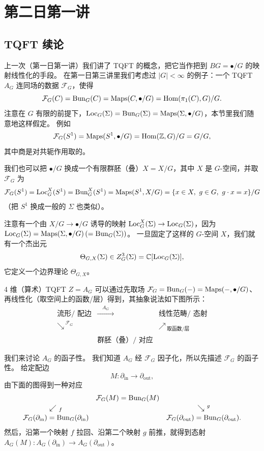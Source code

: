 \section{第二日第一讲}

\subsection{TQFT 续论}
上一次（第一日第一讲）我们讲了 TQFT 的概念，把它当作把到 $BG=\bullet/G$ 的映射线性化的手段。
在第一日第三讲里我们考虑过 $|G|<\infty$ 的例子：一个 TQFT $A_G$ 连同场的数据 $\mathcal F_G$，使得
\[
  \mathcal F_G(C)=\operatorname{Bun}_G(C)=\operatorname{Maps}(C,\bullet/G)=\operatorname{Hom}(\pi_1(C),G)/G.
\]
注意在 $G$ 有限的前提下，$\operatorname{Loc}_G(\Sigma)=\operatorname{Bun}_G(\Sigma)=\operatorname{Maps}(\Sigma,\bullet/G)$，本节里我们随意地这样假定。
例如
\[
  \mathcal F_G(S^1)=\operatorname{Maps}(S^1,\bullet/G)=\operatorname{Hom}(\mathbb Z,G)/G=G/G,
\]
其中商是对共轭作用取的。

我们也可以把 $\bullet/G$ 换成一个有限群胚（叠）$X=X/G$，其中 $X$ 是 $G$-空间，并取 $\mathcal F_G$ 为
\[
  \mathcal F_G(S^1)=\operatorname{Loc}^X_G(S^1)=\operatorname{Bun}^X_G(S^1)=\operatorname{Maps}(S^1,X/G)
  =\{x\in X,\ g\in G,\ g\cdot x=x\}/G
\]
（把 $S^1$ 换成一般的 $\Sigma$ 也类似）。

注意有一个由 $X/G\to\bullet/G$ 诱导的映射 $\operatorname{Loc}^X_G(\Sigma)\to\operatorname{Loc}_G(\Sigma)$，因为 $\operatorname{Loc}_G(\Sigma)=\operatorname{Maps}(\Sigma,\bullet/G)\,(=\operatorname{Bun}_G(\Sigma))$。
一旦固定了这样的 $G$-空间 $X$，我们就有一个杰出元
\[
  \Theta_{G,X}(\Sigma)\in Z^3_G(\Sigma)=\mathbb C[\operatorname{Loc}_G(\Sigma)],
\]
它定义一个边界理论 $\Theta_{G,X}$。

4 维（算术）TQFT $Z=A_G$ 可以通过先取场 $\mathcal F_G=\operatorname{Bun}_G(-)=\operatorname{Maps}(-,\bullet/G)$、再线性化（取空间上的函数/层）得到，其抽象说法如下图所示：
\[
\begin{array}{ccc}
\text{流形}/\!\!\text{ 配边} & \xrightarrow{\quad A_G\quad} & \text{线性范畴}/\!\!\text{ 态射}\\[2pt]
\searrow^{\ \mathcal F_G} & & \nearrow_{\ \text{取函数/层}}\\[2pt]
& \text{群胚（叠）}/\!\!\text{ 对应} &
\end{array}
\]

我们来讨论 $A_G$ 的函子性。
我们知道 $A_G$ 经 $\mathcal F_G$ 因子化，所以先描述 $\mathcal F_G$ 的函子性。
给定配边
\[
  M:\partial_{\mathrm{in}}\to\partial_{\mathrm{out}},
\]
由下面的图得到一种对应
\[
\begin{array}{ccc}
& \mathcal F_G(M)=\operatorname{Bun}_G(M) &\\[2pt]
\swarrow_{\ f} & & \searrow^{\ g}\\[2pt]
\mathcal F_G(\partial_{\mathrm{in}})=\operatorname{Bun}_G(\partial_{\mathrm{in}}) & &
\mathcal F_G(\partial_{\mathrm{out}})=\operatorname{Bun}_G(\partial_{\mathrm{out}}).
\end{array}
\]
然后，沿第一个映射 $f$ 拉回、沿第二个映射 $g$ 前推，就得到态射 $A_G(M):A_G(\partial_{\mathrm{in}})\to A_G(\partial_{\mathrm{out}})$。

